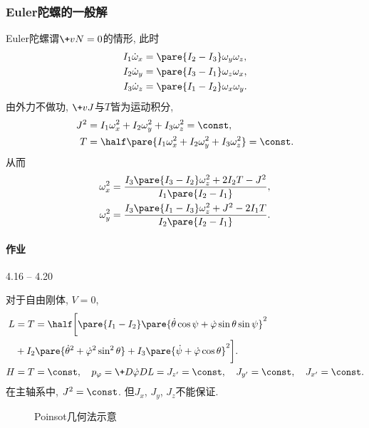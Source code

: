 \documentclass[../LectureNotes.tex]{subfiles}
\begin{document}

\subsubsection{Euler陀螺的一般解} %
\label{ssub:euler陀螺的一般解}

Euler陀螺谓$\+vN=0$的情形, 此时
\begin{align*}
    I_1\dot\omega_x &= \pare{I_2 - I_3}\omega_y \omega_z, \\
    I_2\dot\omega_y &= \pare{I_3 - I_1}\omega_z \omega_x, \\
    I_3\dot\omega_z &= \pare{I_1 - I_2}\omega_x \omega_y.
\end{align*}
由外力不做功, $\+vJ$与$T$皆为运动积分,
\begin{align*}
    J^2 &= I_1\omega_x^2 + I_2\omega_y^2 + I_3\omega_z^2 = \const, \\
    T &= \half \pare{I_1\omega_x^2 + I_2\omega_y^2 + I_3\omega_z^2} = \const.
\end{align*}
从而
\begin{align*}
    \omega_x^2 &= \frac{I_3\pare{I_3 - I_2}\omega_z^2 + 2I_2T - J^2}{I_1\pare{I_2 - I_1}}, \\
    \omega_y^2 &= \frac{I_3\pare{I_1 - I_3}\omega_z^2 + J^2 - 2I_1T}{I_2\pare{I_2 - I_1}}.
\end{align*}

\paragraph{作业} %
\label{par:作业}

4.16 -- 4.20


\par
对于自由刚体, $V = 0$,
\begin{align*}
    L &= T = \half\bigg[\pare{I_1 - I_2}\pare{\dot\theta\cos\psi + \dot\varphi\sin\theta\sin\psi}^2\\ & + I_2\pare{\dot\theta^2 + \dot\varphi^2\sin^2\theta} + I_3\pare{\dot\psi + \dot\varphi\cos\theta}^2\bigg]. \\
    H &= T = \const,\quad p_\varphi = \+D{\dot\varphi}DL = J_{z'} = \const,\quad J_{y'} = \const,\quad J_{x'} = \const.
\end{align*}
在主轴系中, $J^2 = \const$. 但$J_x$, $J_y$, $J_z$不能保证.

\begin{figure}[htb]
    \centering
    \caption{Poinsot几何法示意}
\end{figure}
\end{document}
